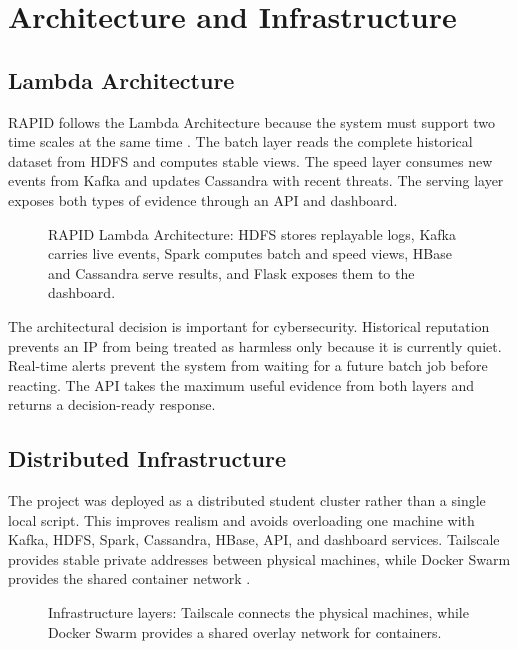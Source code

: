\section{Architecture and Infrastructure}
\label{sec:architecture}

\subsection{Lambda Architecture}

RAPID follows the Lambda Architecture because the system must support two time scales at the same time \cite{marz2015bigdata}. The batch layer reads the complete historical dataset from HDFS and computes stable views. The speed layer consumes new events from Kafka and updates Cassandra with recent threats. The serving layer exposes both types of evidence through an API and dashboard.

\begin{figure}[H]
    \centering
    \resizebox{0.92\textwidth}{!}{}
    \caption{RAPID Lambda Architecture: HDFS stores replayable logs, Kafka carries live events, Spark computes batch and speed views, HBase and Cassandra serve results, and Flask exposes them to the dashboard.}
    \label{fig:lambda-architecture}
\end{figure}

The architectural decision is important for cybersecurity. Historical reputation prevents an IP from being treated as harmless only because it is currently quiet. Real-time alerts prevent the system from waiting for a future batch job before reacting. The API takes the maximum useful evidence from both layers and returns a decision-ready response.

\subsection{Distributed Infrastructure}

The project was deployed as a distributed student cluster rather than a single local script. This improves realism and avoids overloading one machine with Kafka, HDFS, Spark, Cassandra, HBase, API, and dashboard services. Tailscale provides stable private addresses between physical machines, while Docker Swarm provides the shared container network \cite{tailscale_docs,docker_swarm_docs}.

\begin{figure}[H]
    \centering
    \resizebox{0.88\textwidth}{!}{}
    \caption{Infrastructure layers: Tailscale connects the physical machines, while Docker Swarm provides a shared overlay network for containers.}
    \label{fig:tailscale-swarm}
\end{figure}

